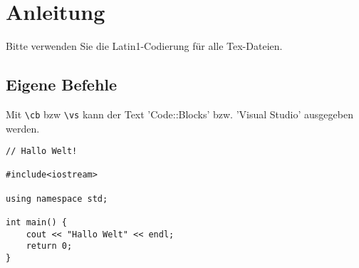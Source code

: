 \chapter{Anleitung}
Bitte verwenden Sie die Latin1-Codierung für alle Tex-Dateien.
\section{Eigene Befehle}
\newline

\newline

Mit \texttt{\textbackslash cb} bzw \texttt{\textbackslash vs} kann der Text 'Code::Blocks' bzw. 'Visual Studio' ausgegeben werden.

\begin{lstlisting}[caption={Listings sind für C++ bereits vordefiniert}]
// Hallo Welt!

#include<iostream>

using namespace std;

int main() {
	cout << "Hallo Welt" << endl;
	return 0;
}
\end{lstlisting}

%
